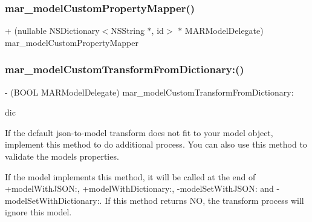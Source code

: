 \mbox{\label{protocol_m_a_r_model_delegate_01-p_a17f8324811ce7af19133d45888efea54}} 
\subsubsection{\texorpdfstring{mar\+\_\+model\+Custom\+Property\+Mapper()}{mar\_modelCustomPropertyMapper()}}
{\footnotesize\ttfamily + (nullable N\+S\+Dictionary$<$N\+S\+String $\ast$, id$>$ $\ast$ M\+A\+R\+Model\+Delegate) mar\+\_\+model\+Custom\+Property\+Mapper \begin{DoxyParamCaption}{ }\end{DoxyParamCaption}}

\mbox{\label{protocol_m_a_r_model_delegate_01-p_ab46fc5681d9e70f11ada2a49b8eae750}} 
\subsubsection{\texorpdfstring{mar\+\_\+model\+Custom\+Transform\+From\+Dictionary\+:()}{mar\_modelCustomTransformFromDictionary:()}}
{\footnotesize\ttfamily -\/ (B\+O\+OL M\+A\+R\+Model\+Delegate) mar\+\_\+model\+Custom\+Transform\+From\+Dictionary\+: \begin{DoxyParamCaption}\item[{(N\+S\+Dictionary $\ast$)}]{dic }\end{DoxyParamCaption}}

If the default json-\/to-\/model transform does not fit to your model object, implement this method to do additional process. You can also use this method to validate the model\textquotesingle{}s properties.

If the model implements this method, it will be called at the end of {\ttfamily +model\+With\+J\+S\+ON\+:}, {\ttfamily +model\+With\+Dictionary\+:}, {\ttfamily -\/model\+Set\+With\+J\+S\+ON\+:} and {\ttfamily -\/model\+Set\+With\+Dictionary\+:}. If this method returns NO, the transform process will ignore this model.


